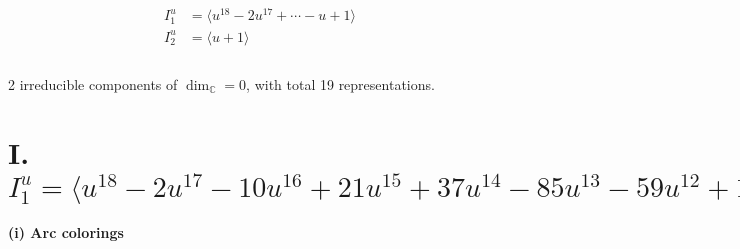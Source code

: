 \documentclass[1p]{elsarticle_modified}
\theoremstyle{definition}
\begin{document}
\begin{align*}
I^u_{1}&=\langle 
u^{18}-2 u^{17}+\cdots- u+1\rangle \\
I^u_{2}&=\langle 
u+1\rangle \\
\\
\end{align*}
\raggedright * 2 irreducible components of $\dim_{\mathbb{C}}=0$, with total 19 representations.\\
\newpage
\renewcommand{\arraystretch}{1}
\centering \section*{I. $I^u_{1}= \langle u^{18}-2 u^{17}-10 u^{16}+21 u^{15}+37 u^{14}-85 u^{13}-59 u^{12}+166 u^{11}+27 u^{10}-160 u^9+30 u^8+65 u^7-39 u^6+5 u^5+9 u^4-7 u^3+2 u^2- u+1 \rangle$}
\flushleft \textbf{(i) Arc colorings}\\
\end{document}
